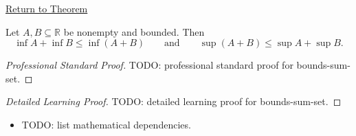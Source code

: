 \newpage
{}
\label{prf:bounds-sum-set}

\begin{remark*}[Return]
\hyperref[prop:bounds-sum-set]{Return to Theorem}
\end{remark*}

\begin{proposition*}
Let $A,B\subseteq\mathbb{R}$ be nonempty and bounded. Then
\[
  \inf A+\inf B\le \inf(A+B)
  \qquad\text{and}\qquad
  \sup(A+B)\le \sup A+\sup B.
\]
\end{proposition*}

\begin{proof}[Professional Standard Proof]
\LRAProofBodyStart
TODO: professional standard proof for bounds-sum-set.
\end{proof}

\begin{proof}[Detailed Learning Proof]
\LRAProofBodyStart
TODO: detailed learning proof for bounds-sum-set.
\end{proof}

\begin{remark*}
\end{remark*}

\begin{dependencies}
\begin{itemize}
  \item TODO: list mathematical dependencies.
\end{itemize}
\end{dependencies}

\clearpage
